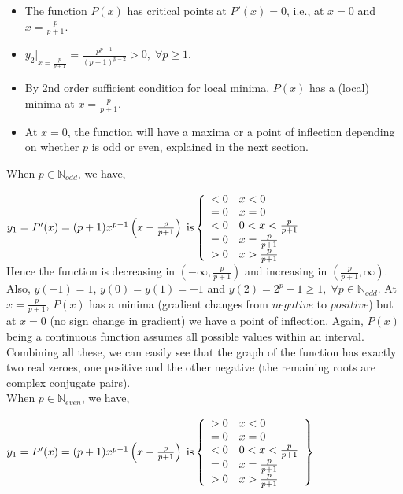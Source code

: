 \documentclass{ijcsa}
\begin{document}
\par 
\begin{itemize}
	\item The function $P(x)$ has critical points at $P'(x)=0$, i.e., at $x=0$ and $x=\frac{p}{p+1}$.
	\item ${y_{2}\Big|}_{x=\frac{p}{p+1}}=\frac{p^{p-1}}{(p+1)^{p-2}}>0,\;\forall{p}\geq{1}$.
	\item By 2nd order sufficient condition for local minima, $P(x)$ has a (local) minima at $x=\frac{p}{p+1}$.
	\item At $x=0$, the function will have a maxima or a point of inflection depending on whether $p$ is odd or even,
				explained in the next section.
\end{itemize}

When $p \in \mathbb{N}_{odd}$, we have,
		\par $y_{1} = P'(x) =(p+1)x^{p-1}\left(x-\frac{p}{p+1}\right)\; \mbox{is} \left\{
		\begin{array}{c l}
			<0 & x < 0 \\
			=0 & x = 0 \\
			<0 & 0 < x < \frac{p}{p+1} \\
			=0 & x = \frac{p}{p+1} \\
			>0 & x > \frac{p}{p+1}
		\end{array}
		\right.$ \\
		
Hence the function is decreasing in $\left(-\infty, \frac{p}{p+1}\right)$ and increasing in $\left(\frac{p}{p+1}, \infty
\right)$.	Also, $y(-1)=1$,  $y(0)=y(1)=-1$  and $y(2)=2^{p}-1\geq 1, \; \forall{p} \in \mathbb{N}_{odd}$. At $x = 				
\frac{p}{p+1}$, $P(x)$ has a minima (gradient changes from $negative$ to $positive$) but at $x=0$ (no sign change in gradient) we 
have a point of inflection. Again, $P(x)$ being a continuous function assumes all possible values within an interval. 
Combining all these, we can easily see that the graph of the function has exactly two real zeroes, 
one positive and the other negative (the remaining roots are complex conjugate pairs). \\

When $p \in \mathbb{N}_{even}$, we have,
	\par $y_{1} = P'(x) =(p+1)x^{p-1}\left(x-\frac{p}{p+1}\right)\; \mbox{is} \left\{
		\begin{array}{c l}
			>0 & x < 0 \\
			=0 & x = 0 \\
			<0 & 0 < x < \frac{p}{p+1} \\
			=0 & x = \frac{p}{p+1} \\
			>0 & x > \frac{p}{p+1}
		\end{array}
		\right\}$ \\
		
\end{document}
